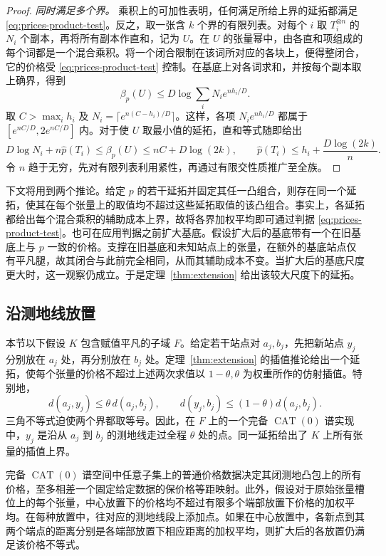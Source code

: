 \begin{proof}
\smallskip\noindent
\emph{同时满足多个界。} 乘积上的可加性表明，任何满足所给上界的延拓都满足 \eqref{eq:prices-product-test}。反之，取一张含 \(k\) 个界的有限列表。对每个 \(i\) 取 \(T_i^{\otimes n}\) 的 \(N_i\) 个副本，再将所有副本作直和，记为 \(U\)。在 \(U\) 的张量幂中，由各直和项组成的每个词都是一个混合乘积。将一个闭合限制在该词所对应的各块上，便得整闭合，它的价格受 \eqref{eq:prices-product-test} 控制。在基底上对各词求和，并按每个副本取上确界，得到
\[
 \beta_p(U)\le D\log\sum_i N_i e^{nh_i/D}.
\]
取 \(C>\max_i h_i\) 及 \(N_i=\lceil e^{n(C-h_i)/D}\rceil\)。这样，各项 \(N_i e^{nh_i/D}\) 都属于 \([e^{nC/D},2e^{nC/D}]\) 内。对于使 \(U\) 取最小值的延拓，直和等式随即给出
\[
 D\log N_i+n\widehat p(T_i)\le\beta_p(U)\le nC+D\log(2k),
 \qquad
 \widehat p(T_i)\le h_i+\frac{D\log(2k)}{n}.
\]
令 \(n\) 趋于无穷，先对有限列表利用紧性，再通过有限交性质推广至全族。
\end{proof}

下文将用到两个推论。给定 \(p\) 的若干延拓并固定其任一凸组合，则存在同一个延拓，使其在每个张量上的取值均不超过这些延拓取值的该凸组合。事实上，各延拓都给出每个混合乘积的辅助成本上界，故将各界加权平均即可通过判据 \eqref{eq:prices-product-test}。也可在应用判据之前扩大基底。假设扩大后的基底带有一个在旧基底上与 \(p\) 一致的价格。支撑在旧基底和未知站点上的张量，在额外的基底站点仅有平凡腿，故其闭合与此前完全相同，从而其辅助成本不变。当扩大后的基底尺度更大时，这一观察仍成立。于是定理~\ref{thm:extension} 给出该较大尺度下的延拓。

\subsection{沿测地线放置}
本节以下假设 \(K\) 包含赋值平凡的子域 \(F\)。给定若干站点对 \(a_j,b_j\)，先把新站点 \(y_j\) 分别放在 \(a_j\) 处，再分别放在 \(b_j\) 处。定理~\ref{thm:extension} 的插值推论给出一个延拓，使每个张量的价格不超过上述两次求值以 \(1-\theta,\theta\) 为权重所作的仿射插值。特别地，
\[
 d(a_j,y_j)\le\theta\,d(a_j,b_j),\qquad
 d(y_j,b_j)\le(1-\theta)d(a_j,b_j).
\]
三角不等式迫使两个界都取等号。因此，在 \(F\) 上的一个完备 \(\operatorname{CAT}(0)\) 谱实现中，\(y_j\) 是沿从 \(a_j\) 到 \(b_j\) 的测地线走过全程 \(\theta\) 处的点。同一延拓给出了 \(K\) 上所有张量的插值上界。

\begin{lemma}[测地决定性与次平均不等式]\label{lem:geodesic}
完备 \(\operatorname{CAT}(0)\) 谱空间中任意子集上的普通价格数据决定其闭测地凸包上的所有价格，至多相差一个固定给定数据的保价格等距映射。此外，假设对于原始张量槽位上的每个张量，中心放置下的价格均不超过有限多个端部放置下价格的加权平均。在每种放置中，往对应的测地线段上添加点。如果在中心放置中，各新点到其两个端点的距离分别是各端部放置下相应距离的加权平均，则扩大后的各放置仍满足该价格不等式。
\end{lemma}

